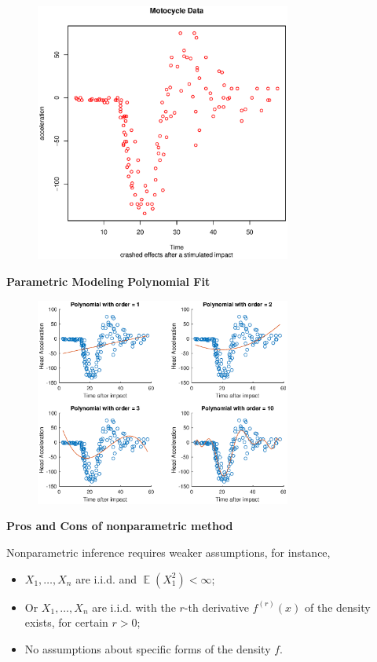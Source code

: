 \documentclass[19pt,landscaoe]{article}
\DeclareMathOperator{\E}{\mathbb{E}}
\begin{document}
\begin{figure}[h]
\centering
      \includegraphics[width=0.75\textwidth,height=0.52\textwidth]{MotocycleData.eps}
    \label{figure2} 

\end{figure}

\newpage
{\LARGE{\textbf{Parametric Modeling}}}
\vskip25pt
{\Large\bf{Polynomial Fit}}

\begin{figure}[h]
\centering
      \includegraphics[width=0.75\textwidth,height=0.52\textwidth]{polyfitting.eps}
    \label{figure3} 

\end{figure}

\newpage
{\LARGE\centerline{\textbf{Pros and Cons of nonparametric method}}}
\vskip25pt
\begin{minipage}{.9\textwidth}
    \Large

Nonparametric inference requires weaker assumptions, for instance, 
\vfill
\begin{itemize}
\item $X_1,\dots,X_n$ are i.i.d. and $\E(X_1^2)<\infty$;
\item Or $X_1,\dots,X_n$ are i.i.d. with the $r$-th derivative $f^{(r)}(x)$ of the density exists, for certain $r>0$;
\item No assumptions about specific forms of the density $f$.
\end{itemize}
\end{minipage}
\end{document}
